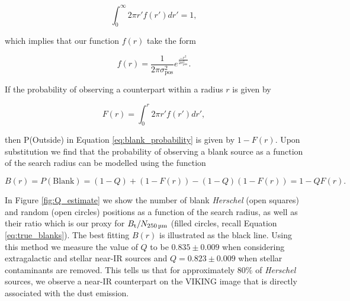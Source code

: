 \begin{equation}
    \int_0^\infty 2\pi r'f(r')dr' = 1,
\end{equation}

\noindent which implies that our function $f(r)$ take the form

\begin{equation}
    f(r) = \frac{1}{2\pi\sigma_\textrm{pos}^2}e^{\frac{-r^2}{2\sigma_\textrm{pos}^2}}.
\label{eq:positional_offset_distribution}
\end{equation}

If the probability of observing a counterpart within a radius $r$ is given by

\begin{equation}
    F(r) = \int_0^r 2\pi r'f(r')dr',
\end{equation}

\noindent then P(Outside) in Equation \ref{eq:blank_probability} is given by $1 - F(r)$. Upon substitution we find that the probability of observing a blank source as a function of the search radius can be modelled using the function

\begin{equation}
    B(r) = P(\textrm{Blank}) = (1-Q) + (1-F(r)) - (1-Q)(1-F(r)) = 1 - QF(r).
\label{eq:blanks_model}
\end{equation}

In Figure \ref{fig:Q_estimate} we show the number of blank \textit{Herschel} (open squares) and random (open circles) positions as a function of the search radius, as well as their ratio which is our proxy for $B_{\textrm{t}}/N_{\textrm{250\,\micron}}$ (filled circles, recall Equation \ref{eq:true_blanks}). The best fitting $B(r)$ is illustrated as the black line. Using this method we measure the value of $Q$ to be $0.835\pm0.009$ when considering extragalactic and stellar near-IR sources and $Q = 0.823\pm0.009$ when stellar contaminants are removed. This tells us that for approximately $80\%$ of \textit{Herschel} sources, we observe a near-IR counterpart on the VIKING image that is directly associated with the dust emission.

